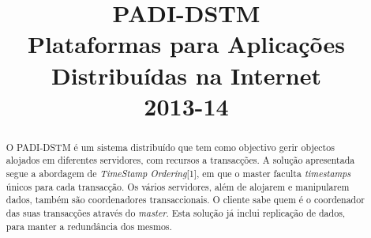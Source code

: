 \documentclass[times, 10pt,twocolumn]{article}
\begin{document}
\title{\huge{PADI-DSTM} \\[0,1in] \textmd{Plataformas para Aplicações Distribuídas na Internet \\[0,05in] 2013-14}}

\maketitle
\thispagestyle{empty}

\begin{abstract}
O PADI-DSTM é um sistema distribuído que tem como objectivo gerir objectos alojados em diferentes servidores, com recursos a transacções. A solução apresentada segue a abordagem de \textit{TimeStamp Ordering}[1], em que o master faculta \textit{timestamps} únicos para cada transacção. Os vários servidores, além de alojarem e manipularem dados, também são coordenadores transaccionais. O cliente sabe quem é o coordenador das suas transacções através do \textit{master}. Esta solução já inclui replicação de dados, para manter a redundância dos mesmos.
\end{abstract}







\nocite{ex1}


\end{document}
